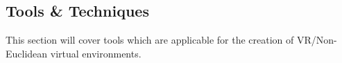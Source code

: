	\subsection{Tools \& Techniques}
	\label{lr:cross:tools}
		This section will cover tools which are applicable for the creation of VR/Non-Euclidean virtual environments.

